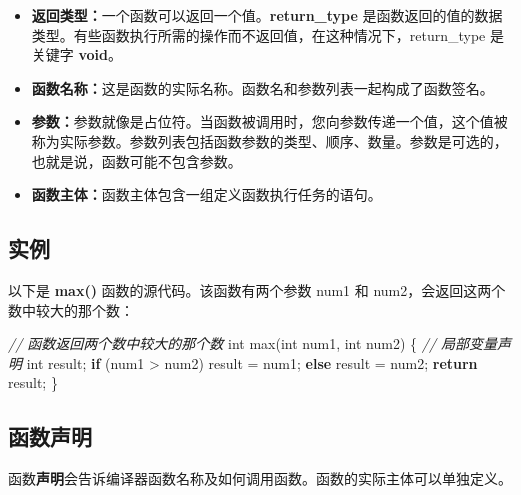 \documentclass[
]{article}
\newenvironment{Shaded}{}{}
\newcommand{\CommentTok}[1]{\textcolor[rgb]{0.38,0.63,0.69}{\textit{#1}}}
\newcommand{\ControlFlowTok}[1]{\textcolor[rgb]{0.00,0.44,0.13}{\textbf{#1}}}
\newcommand{\DataTypeTok}[1]{\textcolor[rgb]{0.56,0.13,0.00}{#1}}
\newcommand{\NormalTok}[1]{#1}
\newcommand{\OperatorTok}[1]{\textcolor[rgb]{0.40,0.40,0.40}{#1}}
\providecommand{\tightlist}{%
  \setlength{\itemsep}{0pt}\setlength{\parskip}{0pt}}
\begin{document}
\begin{itemize}
\tightlist
\item
  \textbf{返回类型：}一个函数可以返回一个值。\textbf{return\_type}
  是函数返回的值的数据类型。有些函数执行所需的操作而不返回值，在这种情况下，return\_type
  是关键字 \textbf{void}。
\item
  \textbf{函数名称：}这是函数的实际名称。函数名和参数列表一起构成了函数签名。
\item
  \textbf{参数：}参数就像是占位符。当函数被调用时，您向参数传递一个值，这个值被称为实际参数。参数列表包括函数参数的类型、顺序、数量。参数是可选的，也就是说，函数可能不包含参数。
\item
  \textbf{函数主体：}函数主体包含一组定义函数执行任务的语句。
\end{itemize}

\hypertarget{ux5b9eux4f8b-11}{%
\subsection{实例}\label{ux5b9eux4f8b-11}}

以下是 \textbf{max()} 函数的源代码。该函数有两个参数 num1 和
num2，会返回这两个数中较大的那个数：

\begin{Shaded}
\begin{Highlighting}[]
\CommentTok{// 函数返回两个数中较大的那个数 }
\DataTypeTok{int}\NormalTok{ max}\OperatorTok{(}\DataTypeTok{int}\NormalTok{ num1}\OperatorTok{,} \DataTypeTok{int}\NormalTok{ num2}\OperatorTok{)} \OperatorTok{\{}
   \CommentTok{// 局部变量声明   }
   \DataTypeTok{int}\NormalTok{ result}\OperatorTok{;}    
   \ControlFlowTok{if} \OperatorTok{(}\NormalTok{num1 }\OperatorTok{\textgreater{}}\NormalTok{ num2}\OperatorTok{)}
\NormalTok{      result }\OperatorTok{=}\NormalTok{ num1}\OperatorTok{;}
   \ControlFlowTok{else}
\NormalTok{      result }\OperatorTok{=}\NormalTok{ num2}\OperatorTok{;}    
   \ControlFlowTok{return}\NormalTok{ result}\OperatorTok{;} 
\OperatorTok{\}}
\end{Highlighting}
\end{Shaded}

\hypertarget{ux51fdux6570ux58f0ux660e}{%
\subsection{函数声明}\label{ux51fdux6570ux58f0ux660e}}

函数\textbf{声明}会告诉编译器函数名称及如何调用函数。函数的实际主体可以单独定义。
\end{document}
